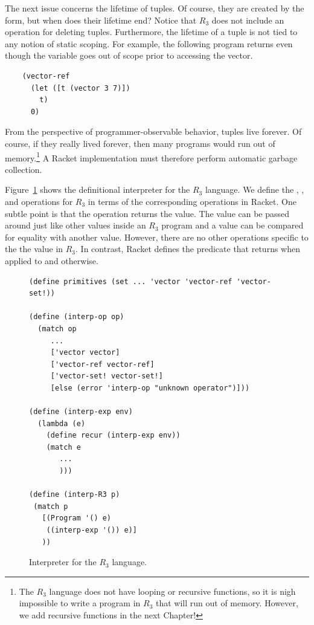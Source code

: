 \documentclass[11pt]{book}
\begin{document}
The next issue concerns the lifetime of tuples. Of course, they are
created by the  form, but when does their lifetime end?
Notice that $R_3$ does not include an operation for deleting
tuples. Furthermore, the lifetime of a tuple is not tied to any notion
of static scoping. For example, the following program returns 
even though the variable  goes out of scope prior to accessing
the vector.
\begin{center}
\begin{minipage}{0.96\textwidth}
\begin{lstlisting}
    (vector-ref
      (let ([t (vector 3 7)])
        t)
      0)
\end{lstlisting}
\end{minipage}
\end{center}

From the perspective of programmer-observable behavior, tuples live
forever. Of course, if they really lived forever, then many programs
would run out of memory.\footnote{The $R_3$ language does not have
  looping or recursive functions, so it is nigh impossible to write a
  program in $R_3$ that will run out of memory. However, we add
  recursive functions in the next Chapter!} A Racket implementation
must therefore perform automatic garbage collection.

Figure~\ref{fig:interp-R3} shows the definitional interpreter for the
$R_3$ language. We define the , , and
 operations for $R_3$ in terms of the corresponding
operations in Racket. One subtle point is that the 
operation returns the  value. The  value
can be passed around just like other values inside an $R_3$ program
and a  value can be compared for equality with another
 value. However, there are no other operations specific
to the the  value in $R_3$. In contrast, Racket defines
the  predicate that returns  when applied to
 and  otherwise.

\begin{figure}[tbp]
\begin{lstlisting}
(define primitives (set ... 'vector 'vector-ref 'vector-set!))

(define (interp-op op)
  (match op
     ...
     ['vector vector]
     ['vector-ref vector-ref]
     ['vector-set! vector-set!]
     [else (error 'interp-op "unknown operator")]))

(define (interp-exp env)
  (lambda (e)
    (define recur (interp-exp env))
    (match e
       ...
       )))

(define (interp-R3 p)
 (match p
   [(Program '() e)
    ((interp-exp '()) e)]
   ))
\end{lstlisting}
\caption{Interpreter for the $R_3$ language.}
\label{fig:interp-R3}
\end{figure}
\end{document}
